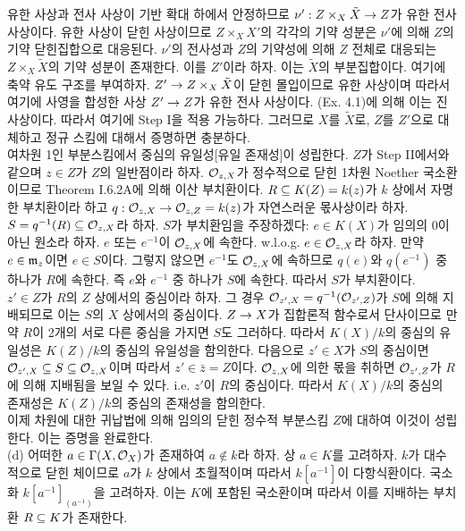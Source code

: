 \begin{enumerate}[label=\tb{4.\arabic*.},itemindent=0mm,itemsep=4mm]
	유한 사상과 전사 사상이 기반 확대 하에서 안정하므로 $\nu':Z\times_X\tilde X\rightarrow Z$가 유한 전사 사상이다.
	유한 사상이 닫힌 사상이므로 $Z\times_XX'$의 각각의 기약 성분은 $\nu'$에 의해 $Z$의 기약 닫힌집합으로 대응된다.
	$\nu'$의 전사성과 $Z$의 기약성에 의해 $Z$ 전체로 대응되는 $Z\times_X\tilde X$의 기약 성분이 존재한다. 이를 $Z'$이라 하자.
	이는 $\tilde X$의 부분집합이다. 여기에 축약 유도 구조를 부여하자. $Z'\rightarrow Z\times_X\tilde X$이 닫힌 몰입이므로 유한 사상이며
	따라서 여기에 사영을 합성한 사상 $Z'\rightarrow Z$가 유한 전사 사상이다. (Ex. 4.1)에 의해 이는 진 사상이다.
	따라서 여기에 Step I을 적용 가능하다.
	그러므로 $X$를 $\tilde X$로, $Z$를 $Z'$으로 대체하고 정규 스킴에 대해서 증명하면 충분하다.\\[2mm]
	 여차원 1인 부분스킴에서 중심의 유일성[유일 존재성]이 성립한다.
	$Z$가 Step II에서와 같으며 $z\in Z$가 $Z$의 일반점이라 하자.
	$\mathcal{O}_{z,X}$가 정수적으로 닫힌 1차원 Noether 국소환이므로 Theorem I.6.2A에 의해 이산 부치환이다.
	$R\subseteq K(Z)=k(z)$가 $k$ 상에서 자명한 부치환이라 하고 $q:\mathcal{O}_{z,X}\rightarrow\mathcal{O}_{z,Z}=k(z)$가 자연스러운 몫사상이라 하자.
	$S=q^{-1}(R)\subseteq\mathcal{O}_{z,X}$라 하자. $S$가 부치환임을 주장하겠다:
	$e\in K(X)$가 임의의 0이 아닌 원소라 하자. $e$ 또는 $e^{-1}$이 $\mathcal{O}_{z,X}$에 속한다.
	w.l.o.g. $e\in\mathcal{O}_{z,X}$라 하자. 만약 $e\in\mathfrak{m}_z$이면 $e\in S$이다.
	그렇지 않으면 $e^{-1}$도 $\mathcal{O}_{z,X}$에 속하므로 $q(e)$와 $q(e^{-1})$ 중 하나가 $R$에 속한다.
	즉 $e$와 $e^{-1}$ 중 하나가 $S$에 속한다. 따라서 $S$가 부치환이다.\\
	$z'\in Z$가 $R$의 $Z$ 상에서의 중심이라 하자.
	그 경우 $\mathcal{O}_{z',X}=q^{-1}(\mathcal{O}_{z',Z})$가 $S$에 의해 지배되므로 이는 $S$의 $X$ 상에서의 중심이다.
	$Z\rightarrow X$가 집합론적 함수로서 단사이므로 만약 $R$이 2개의 서로 다른 중심을 가지면 $S$도 그러하다.
	따라서 $K(X)/k$의 중심의 유일성은 $K(Z)/k$의 중심의 유일성을 함의한다.
	다음으로 $z'\in X$가 $S$의 중심이면 $\mathcal{O}_{z',X}\subseteq S\subseteq\mathcal{O}_{z,X}$이며 따라서 $z'\in\bar z=Z$이다.
	$\mathcal{O}_{z,X}$에 의한 몫을 취하면 $\mathcal{O}_{z',Z}$가 $R$에 의해 지배됨을 보일 수 있다. i.e. $z'$이 $R$의 중심이다.
	따라서 $K(X)/k$의 중심의 존재성은 $K(Z)/k$의 중심의 존재성을 함의한다.\\[2mm]
	이제 차원에 대한 귀납법에 의해 임의의 닫힌 정수적 부분스킴 $Z$에 대하여 이것이 성립한다. 이는 증명을 완료한다.\\
	(d) 어떠한 $a\in\Gamma(X,\mathcal{O}_X)$가 존재하여 $a\notin k$라 하자. 상 $a\in K$를 고려하자.
	$k$가 대수적으로 닫힌 체이므로 $a$가 $k$ 상에서 초월적이며 따라서 $k[a^{-1}]$이 다항식환이다.
	국소화 $k[a^{-1}]_{(a^{-1})}$을 고려하자. 이는 $K$에 포함된 국소환이며 따라서 이를 지배하는 부치환 $R\subseteq K$가 존재한다.

\end{enumerate}

